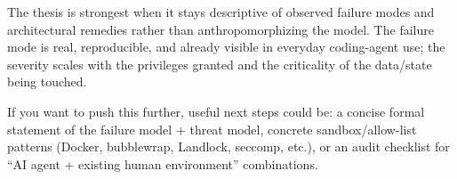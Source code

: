 The thesis is strongest when it stays descriptive of observed failure modes and architectural remedies rather than anthropomorphizing the model. The failure mode is real, reproducible, and already visible in everyday coding-agent use; the severity scales with the privileges granted and the criticality of the data/state being touched.

If you want to push this further, useful next steps could be:
a concise formal statement of the failure model + threat model,
concrete sandbox/allow-list patterns (Docker, bubblewrap, Landlock, seccomp, etc.),
or an audit checklist for “AI agent + existing human environment” combinations.

